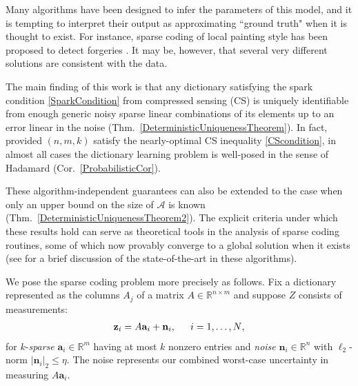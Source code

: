 \documentclass[journal, twocolumn]{IEEEtran}
\begin{document}
Many algorithms have been designed to infer the parameters of this model, and it is tempting to interpret their output as approximating ``ground truth" when it is thought to exist.  For instance, sparse coding of local painting style has been proposed to detect forgeries \cite{hughes2010, Olshausen10}. 
It may be, however, that several very different solutions are consistent with the data. 

The main finding of this work is that any dictionary satisfying the spark condition \eqref{SparkCondition} from compressed sensing (CS) is uniquely identifiable from enough generic noisy sparse linear combinations of its elements up to an error linear in the noise (Thm.~\ref{DeterministicUniquenessTheorem}). In fact, provided $(n, m, k)$ satisfy the nearly-optimal CS inequality \eqref{CScondition}, in almost all cases the dictionary learning problem is well-posed in the sense of Hadamard \cite{Hadamard1902} (Cor.~\ref{ProbabilisticCor}). 

These algorithm-independent guarantees can also be extended to the case when only an upper bound on the size of $\mathcal{A}$ is known (Thm.~\ref{DeterministicUniquenessTheorem2}). The explicit criteria under which these results hold can serve as theoretical tools in the analysis of sparse coding routines, some of which now provably converge to a global solution when it exists (see \cite[Sec.~I-E]{Sun16} for a brief discussion of the state-of-the-art in these algorithms). 


We pose the sparse coding problem more precisely as follows. Fix a dictionary represented as the columns $A_j$ of a matrix $A \in \mathbb R^{n \times m}$ and suppose $Z$ consists of measurements:
\begin{align}\label{LinearModel}
\mathbf{z}_i = A\mathbf{a}_i + \mathbf{n}_i,\indent \text{$i=1,\ldots,N$},
\end{align}
for $k$-\emph{sparse} $\mathbf{a}_i \in \mathbb{R}^m$ having at most $k$ nonzero entries and \emph{noise} $\mathbf{n}_i \in \mathbb{R}^n$ with $\ell_2$-norm $| \mathbf{n}_i |_2 \leq  \eta$. The noise represents our combined worst-case uncertainty in  measuring $A\mathbf{a}_i$.
\end{document}
